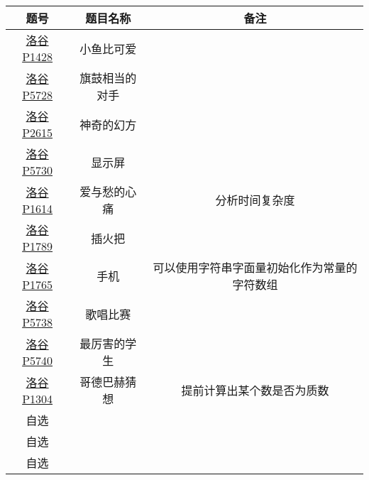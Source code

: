 \begin{problemset}
	\begin{table}[H]
		\centering
		\begin{tabular}{|c|c|c|}
			\hline
			题号 & 题目名称 & 备注
			\\\hline
			\href{https://www.luogu.com.cn/problem/P1428}{洛谷 P1428} & 小鱼比可爱 &
			\\\hline
			\href{https://www.luogu.com.cn/problem/P5728}{洛谷 P5728} & 旗鼓相当的对手 &
			\\\hline
			\href{https://www.luogu.com.cn/problem/P2615}{洛谷 P2615} & 神奇的幻方 &
			\\\hline
			\href{https://www.luogu.com.cn/problem/P5730}{洛谷 P5730} & 显示屏 &
			\\\hline
			\href{https://www.luogu.com.cn/problem/P1614}{洛谷 P1614} & 爱与愁的心痛 & 分析时间复杂度
			\\\hline
			\href{https://www.luogu.com.cn/problem/P1789}{洛谷 P1789} & 插火把 &
			\\\hline
			\href{https://www.luogu.com.cn/problem/P1765}{洛谷 P1765} & 手机 & 可以使用字符串字面量初始化作为常量的字符数组
			\\\hline
			\href{https://www.luogu.com.cn/problem/P5738}{洛谷 P5738} & 歌唱比赛 &
			\\\hline
			\href{https://www.luogu.com.cn/problem/P5740}{洛谷 P5740} & 最厉害的学生 &
			\\\hline
			\href{https://www.luogu.com.cn/problem/P1304}{洛谷 P1304} & 哥德巴赫猜想 & 提前计算出某个数是否为质数
			\\\hline
			自选 & &
			\\\hline
			自选 & &
			\\\hline
			自选 & &
			\\\hline
		\end{tabular}
	\end{table}

\end{problemset}
